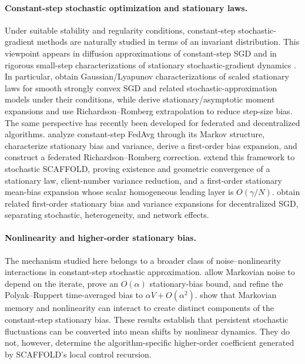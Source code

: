 \documentclass[11pt]{article}
\theoremstyle{definition}
\newcommand{\Scaf}{\textnormal{\textsc{SCAFFOLD}}}
\begin{document}
\paragraph{Constant-step stochastic optimization and stationary laws.}
Under suitable stability and regularity conditions, constant-step stochastic-gradient methods are naturally studied in terms of an invariant distribution. This viewpoint appears in diffusion approximations of constant-step SGD \citep{mandt2017sgd} and in rigorous small-step characterizations of stationary stochastic-gradient dynamics \citep{dieuleveut2020bridging,chen2022stationary}. In particular, \citet{chen2022stationary} obtain Gaussian/Lyapunov characterizations of scaled stationary laws for smooth strongly convex SGD and related stochastic-approximation models under their conditions, while \citet{dieuleveut2020bridging} derive stationary/asymptotic moment expansions and use Richardson--Romberg extrapolation to reduce step-size bias. The same perspective has recently been developed for federated and decentralized algorithms. \citet{mangold2025fedavg} analyze constant-step FedAvg through its Markov structure, characterize stationary bias and variance, derive a first-order bias expansion, and construct a federated Richardson--Romberg correction. \citet{mangold2025scaffold} extend this framework to stochastic \Scaf{}, proving existence and geometric convergence of a stationary law, client-number variance reduction, and a first-order stationary mean-bias expansion whose scalar homogeneous leading layer is $O(\gamma/N)$. \citet{versini2026dsgd} obtain related first-order stationary bias and variance expansions for decentralized SGD, separating stochastic, heterogeneity, and network effects.

\paragraph{Nonlinearity and higher-order stationary bias.}
The mechanism studied here belongs to a broader class of noise--nonlinearity interactions in constant-step stochastic approximation. \citet{allmeier2024bias} allow Markovian noise to depend on the iterate, prove an $O(\alpha)$ stationary-bias bound, and refine the Polyak--Ruppert time-averaged bias to $\alpha V+O(\alpha^2)$. \citet{huo2024collusion} show that Markovian memory and nonlinearity can interact to create distinct components of the constant-step stationary bias. These results establish that persistent stochastic fluctuations can be converted into mean shifts by nonlinear dynamics. They do not, however, determine the algorithm-specific higher-order coefficient generated by \Scaf{}'s local control recursion.
\end{document}
